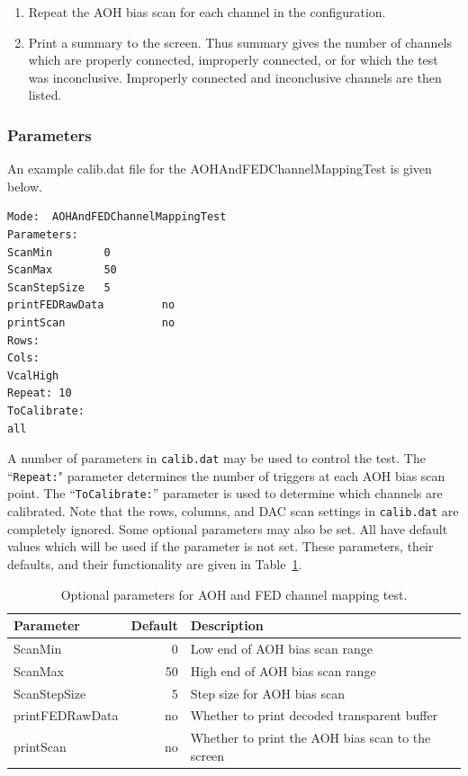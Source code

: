\begin{enumerate}
\item Repeat the AOH bias scan for each channel in the configuration.
\item Print a summary to the screen.  Thus summary gives the number of channels which are properly connected, improperly connected, or for which the test was inconclusive.  Improperly connected and inconclusive channels are then listed.
\end{enumerate}

\subsubsection{Parameters}
An example calib.dat file for the AOHAndFEDChannelMappingTest is given below.

\begin{verbatim}
Mode:  AOHAndFEDChannelMappingTest
Parameters:
ScanMin        0
ScanMax        50
ScanStepSize   5
printFEDRawData         no
printScan               no
Rows:
Cols:
VcalHigh
Repeat: 10
ToCalibrate:
all
\end{verbatim}

A number of parameters in \verb|calib.dat| may be used to control the test. The ``\verb|Repeat:|" parameter determines the number of triggers at each AOH bias scan point.  The ``\verb|ToCalibrate:|'' parameter is used to determine which channels are calibrated.  Note that the rows, columns, and DAC scan settings in \verb|calib.dat| are completely ignored. Some optional parameters may also be set.  All have default values which will be used if the parameter is not set.  These parameters, their defaults, and their functionality are given in Table~\ref{tab:AOHAndFEDChannelMappingTestParameters}.

\begin{table}
\centering
\caption{Optional parameters for AOH and FED channel mapping test.}
\label{tab:AOHAndFEDChannelMappingTestParameters}
\begin{tabular}{l@{~~~~}r@{~~~~}l}
\hline
\hline
Parameter & Default & Description \\
\hline
ScanMin                     &   0 & Low end of AOH bias scan range \\
ScanMax                     &  50 & High end of AOH bias scan range \\
ScanStepSize                &   5 & Step size for AOH bias scan \\
printFEDRawData             &  no & Whether to print decoded transparent buffer \\
printScan                   &  no & Whether to print the AOH bias scan to the screen \\
\hline
\hline
\end{tabular}
\end{table}

